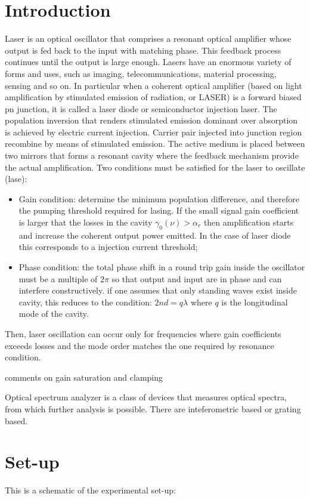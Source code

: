 \documentclass[
10pt, %
oneside, %
headinclude,footinclude, %
BCOR5mm, %
]{article}
\begin{document}
\section{Introduction}
Laser is an optical oscillator that comprises a resonant optical amplifier whose output is fed back to the input with matching phase. This feedback process continues until the output is large enough. 
Lasers have an enormous variety of forms and uses, such as imaging, telecommunications, material processing, sensing and so on. In particular when a coherent optical amplifier (based on light amplification by stimulated emission of radiation, or LASER) is a forward biased pn junction, it is called a laser diode or semiconductor injection laser.  The population inversion that renders stimulated emission dominant over absorption is achieved by electric current injection. Carrier pair injected into junction region recombine by means of stimulated emission. The active medium is placed between two mirrors that forms a resonant cavity where the feedback mechanism provide the actual amplification.  
Two conditions must be satisfied for the laser to oscillate (lase):
\begin{itemize}
    \item Gain condition: determine the minimum population difference, and therefore the pumping threshold required for lasing. If the small signal gain coefficient is larger that the losses in the cavity $\gamma_0(\nu) > \alpha_r$ then amplification starts and increase the coherent output power emitted. In the case of laser diode this corresponds to a injection current threshold;
    \item Phase condition: the total phase shift in a round trip gain inside the oscillator must be a multiple of $2 \pi$ so that output and input are in phase and can interfere constructively. if one assumes that only standing waves exist inside cavity, this reduces to the condition: $2 n d = q\lambda$ where $q$ is the longitudinal mode of the cavity.
\end{itemize}
Then, laser oscillation can occur only for frequencies where gain coefficients exceeds losses and the mode order matches the one required by resonance condition. 

comments on gain saturation and clamping

Optical spectrum analyzer is a class of devices that measures optical spectra, from which further analysis is possible. There are inteferometric based or grating based. 

\section{Set-up}
This is a schematic of the experimental set-up:
\end{document}
